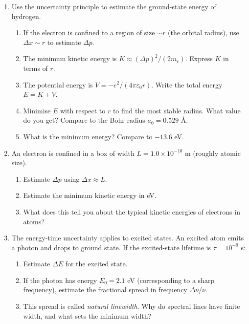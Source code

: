 \documentclass[12pt, a4paper]{book}
\newcommand{\newterm}[1]{\textit{\textcolor{DiscoveryColor}{#1}}}
\begin{document}
\begin{problembox}
\begin{enumerate}[label=\textbf{\arabic*.}]
  \item Use the uncertainty principle to estimate the
        ground-state energy of hydrogen.
        \begin{enumerate}[label=(\alph*)]
          \item If the electron is confined to a region
                of size $\sim r$ (the orbital radius),
                use $\Delta x \sim r$ to estimate $\Delta p$.
          \item The minimum kinetic energy is
                $K \approx (\Delta p)^2/(2m_e)$.
                Express $K$ in terms of $r$.
          \item The potential energy is
                $V = -e^2/(4\pi\varepsilon_0 r)$.
                Write the total energy $E = K + V$.
          \item Minimise $E$ with respect to $r$ to find
                the most stable radius.
                What value do you get?
                Compare to the Bohr radius $a_0 = 0.529$ \AA.
          \item What is the minimum energy? Compare to $-13.6$ eV.
        \end{enumerate}

  \item An electron is confined in a box of width
        $L = 1.0\times10^{-10}$ m (roughly atomic size).
        \begin{enumerate}[label=(\alph*)]
          \item Estimate $\Delta p$ using $\Delta x \approx L$.
          \item Estimate the minimum kinetic energy in eV.
          \item What does this tell you about the typical
                kinetic energies of electrons in atoms?
        \end{enumerate}

  \item The energy-time uncertainty applies to excited states.
        An excited atom emits a photon and drops to ground state.
        If the excited-state lifetime is $\tau = 10^{-9}$ s:
        \begin{enumerate}[label=(\alph*)]
          \item Estimate $\Delta E$ for the excited state.
          \item If the photon has energy $E_0 = 2.1$ eV
                (corresponding to a sharp frequency),
                estimate the fractional spread in frequency
                $\Delta\nu/\nu$.
          \item This spread is called \newterm{natural linewidth}.
                Why do spectral lines have finite width,
                and what sets the minimum width?
        \end{enumerate}
\end{enumerate}
\end{problembox}
\end{document}

